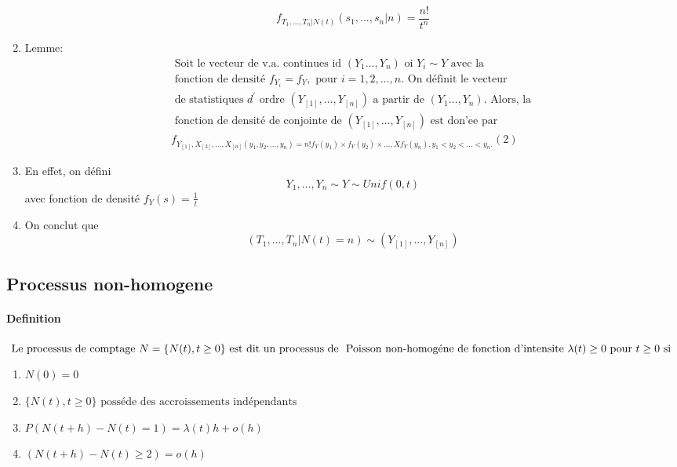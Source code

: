 \begin{enumerate}[label=(\arabic*)]
    \[ f_{T_1,...,T_n|N(t)}(s_1,...,s_n|n) = \frac{n!}{t^n} \]
\item Lemme:
$$\begin{array}{l}{\text { Soit le vecteur de v.a. continues id }\left(Y_{1} \ldots, Y_{n}\right) \text { oi } Y_{i} \sim Y \text { avec la }} \\ {\text { fonction de densité } f_{Y_{i}}=f_{Y}, \text { pour } i=1,2, \ldots, n . \text { On définit le vecteur }} \\ {\text { de statistiques } d^{\prime} \text { ordre }\left(Y_{[1]}, \ldots, Y_{[n]}\right) \text { a partir de }\left(Y_{1} \ldots, Y_{n}\right) . \text { Alors, la }} \\ {\text { fonction de densité de conjointe de }\left(Y_{[1]}, \ldots, Y_{[n]}\right) \text { est don'ee par }} \\ {f_{Y_{[1]}, X_{[3]}, \ldots, X_{[n]}\left(y_{1}, y_{2}, \ldots, y_{n}\right)=n ! f_{Y}\left(y_{1}\right) \times f_{Y}\left(y_{2}\right) \times \ldots, X f_{Y}\left(y_{n}\right), y_{1}<y_{2}<\ldots<y_{n} .}(2)}\end{array}$$
\item En effet, on défini
    \[ Y_1,...,Y_n \sim Y \sim Unif(0,t) \]
        avec fonction de densité $f_Y(s) = \frac{1}{t}$
\item On conclut que
    \[ (T_1,...,T_n|N(t) = n) \sim (Y_{[1]},...,Y_{[n]}) \]
\end{enumerate}

\subsection{Processus non-homogene}
\paragraph{Definition}
${\text { Le processus de comptage } N=\{N(t), t \geq 0\} \text { est dit un processus de }} \\ {\text { Poisson non-homogéne de fonction d'intensite } \lambda(t) \geq 0 \text { pour } t \geq 0 \text { si }}$
\begin{enumerate}[label=(\arabic*)]
    \item $N(0)=0$
    \item $\{N(t), t \geq 0\} \text { posséde des accroissements indépendants }$
    \item $P(N(t+h)-N(t)=1)=\lambda(t) h+o(h) $
    \item $(N(t+h)-N(t) \geq 2)=o(h)$
\end{enumerate}



